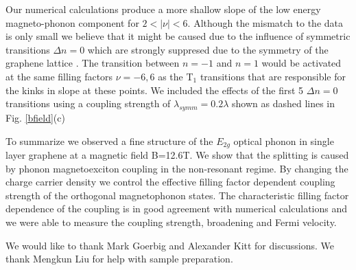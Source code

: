 \documentclass[prl,aps,superscriptaddress,showpacs,reprint]{revtex4-1}
\begin{document}
Our numerical calculations produce a more shallow slope of the low energy magneto-phonon component for $2 < \left|\nu\right| < 6$. Although the mismatch to the data is only small we believe that it might be caused due to the influence of symmetric transitions $\Delta n = 0$ which are strongly suppresed due to the symmetry of the graphene lattice \cite{PhysRevB.84.235138}. The transition between $n=-1$ and $n=1$ would be activated at the same filling factors $\nu=-6,6$ as the T$_1$ transitions that are responsible for the kinks in slope at these points. We included the effects of the first 5 $\Delta n = 0$ transitions using a coupling strength of $\lambda_{symm} =0.2\lambda$ shown as dashed lines in Fig. \ref{bfield}(c)





To summarize we observed a fine structure of the $E_{2g}$ optical phonon in single layer graphene at a magnetic field B=12.6T. We show that the splitting is caused by phonon magnetoexciton coupling in the non-resonant regime. By changing the charge carrier density we control the effective filling factor dependent coupling strength of the orthogonal magnetophonon states. The characteristic filling factor dependence of the coupling is in good agreement with numerical calculations and we were able to measure the coupling strength, broadening and Fermi velocity. 
\\

\begin{acknowledgments}
We would like to thank Mark Goerbig and Alexander Kitt for discussions. We thank Mengkun Liu for help with sample preparation.
\end{acknowledgments}





\end{document}

